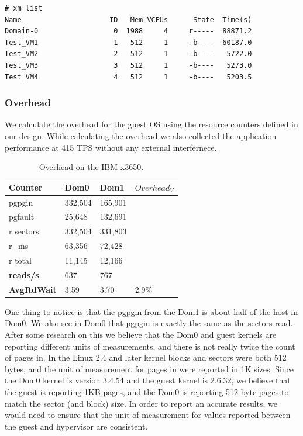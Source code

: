 \begin{Verbatim}
# xm list
Name                     ID   Mem VCPUs      State  Time(s)
Domain-0                  0  1988     4     r-----  88871.2
Test_VM1                  1   512     1     -b----  60187.0
Test_VM2                  2   512     1     -b----   5722.0
Test_VM3                  3   512     1     -b----   5273.0
Test_VM4                  4   512     1     -b----   5203.5
\end{Verbatim}

\subsubsection{Overhead}
We calculate the overhead for the guest OS using the resource counters defined in our design.  While calculating the overhead we also collected the application performance at 415 TPS without any external interfernece.

\begin{table}[h]
\begin{tabular}{ l l l p{5cm} }
  Counter     & Dom0 & Dom1 & $Overhead_V$ \\
  \hline
	pgpgin    & 332,504 & 165,901  &  \\
	pgfault   &  25,648 & 132,691  & \\
	r sectors & 332,504 & 331,803  &\\
	r\_ms     &  63,356 &  72,428  & \\
	r total   &  11,145 &  12,166  & \\
    \textbf{reads/s}    & 637 & 767 & \\
    \textbf{AvgRdWait}  & 3.59 & 3.70 & 2.9\% \\ 
  \hline
\end{tabular}
\caption{Overhead on the IBM x3650.}
\label{tab:OverheadSmall}
\end{table}

One thing to notice is that the pgpgin from the Dom1 is about half of the host in Dom0.  
We also see in Dom0 that pgpgin is exactly the same as the sectors read.  
After some research on this we believe that the Dom0 and guest kernels are reporting different units of measurements, and there is not really twice the count of pages in. 
In the Linux 2.4 and later kernel blocks and sectors were both 512 bytes, and the unit of measurement for pages in were reported in 1K sizes.  Since the Dom0 kernel is version 3.4.54 and the guest kernel is 2.6.32, we believe that the guest is reporting 1KB pages, and the Dom0 is reporting 512 byte pages to match the sector (and block) size.  In order to report an accurate results, we would need to ensure that the unit of measurement for values reported between the guest and hypervisor are consistent.  

